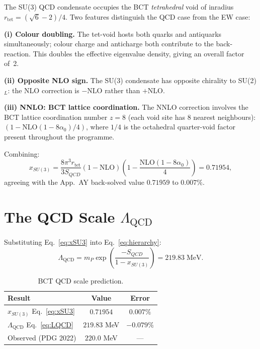 \documentclass[aps,prl,twocolumn,showpacs,preprintnumbers]{revtex4-2}
\newcommand{\rtet}{r_{\mathrm{tet}}}
\newcommand{\azero}{\alpha_0}
\newcommand{\mP}{m_P}
\newcommand{\LQCD}{\Lambda_{\mathrm{QCD}}}
\newcommand{\NLO}{\mathrm{NLO}}
\begin{document}
The SU(3) QCD condensate occupies the BCT \emph{tetrahedral} void
of inradius $\rtet = (\sqrt{6}-2)/4$. Two features distinguish the
QCD case from the EW case:

\textbf{(i) Colour doubling.}
The tet-void hosts both quarks and antiquarks simultaneously;
colour charge and anticharge both contribute to the back-reaction.
This doubles the effective eigenvalue density,
giving an overall factor of~2.

\textbf{(ii) Opposite NLO sign.}
The SU(3) condensate has opposite chirality to SU(2)$_L$: the
NLO correction is $-\NLO$ rather than $+\NLO$.

\textbf{(iii) NNLO: BCT lattice coordination.}
The NNLO correction involves the BCT lattice coordination number
$z = 8$ (each void site has 8 nearest neighbours):
$(1-\NLO(1-8\azero)/4)$, where $1/4$ is the
octahedral quarter-void factor present throughout the programme.

Combining:
\begin{equation}
  \boxed{x_{SU(3)} = \frac{8\pi^3\rtet}{3S_{QCD}}
  \left(1-\NLO\right)
  \left(1 - \frac{\NLO(1-8\azero)}{4}\right) = 0.71954,}
  \label{eq:xSU3}
\end{equation}
agreeing with the App.~AY back-solved value $0.71959$ to
$\mathbf{0.007\%}$.

\section{The QCD Scale $\LQCD$}

Substituting Eq.~\eqref{eq:xSU3} into Eq.~\eqref{eq:hierarchy}:
\begin{equation}
  \boxed{
  \LQCD = \mP\exp\!\left(\frac{-S_{QCD}}{1-x_{SU(3)}}\right)
  = 219.83\;\text{MeV}.
  }
  \label{eq:LQCD}
\end{equation}

\begin{table}[h]
\centering
\caption{BCT QCD scale prediction.}
\label{tab:LQCD}
\begin{tabular}{lcc}
\toprule
Result & Value & Error \\
\midrule
$x_{SU(3)}$ Eq.~\eqref{eq:xSU3} & $0.71954$ & $0.007\%$ \\
$\LQCD$ Eq.~\eqref{eq:LQCD}     & $219.83$ MeV & $\mathbf{-0.079\%}$ \\
\midrule
Observed (PDG 2022)               & $220.0$ MeV  & --- \\
\bottomrule
\end{tabular}
\end{table}
\end{document}
